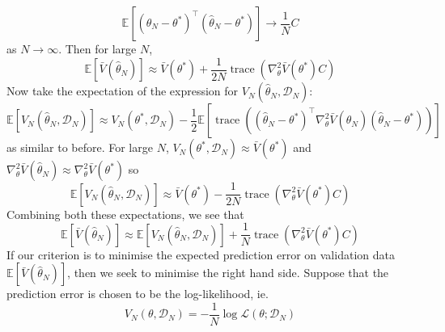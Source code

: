 \documentclass[11pt]{report} %
\begin{document}
\begin{equation}
\mathbb{E}\left[\left(\hat{\theta}_{N} - \theta^{*}\right)^{\top}\left(\hat{\theta}_{N} - \theta^{*}\right)\right] \to \dfrac{1}{N}C
\end{equation}
as $N\to\infty$. Then for large $N$,
\begin{equation}
\mathbb{E}\left[\bar{V}\left(\hat{\theta}_{N}\right)\right] \approx \bar{V}\left(\theta^{*}\right) + \dfrac{1}{2N}\operatorname{trace}\left(\nabla_{\theta}^{2}\bar{V}\left(\theta^{*}\right)C\right)
\end{equation}
Now take the expectation of the expression for $V_{N}\left(\hat{\theta}_{N}, \mathcal{D}_{N}\right)$:
\begin{equation}
\mathbb{E}\left[V_{N}\left(\hat{\theta}_{N}, \mathcal{D}_{N}\right)\right] \approx V_{N}\left(\theta^{*}, \mathcal{D}_{N}\right) - \dfrac{1}{2}\mathbb{E}\left[\operatorname{trace}\left(\left(\hat{\theta}_{N} - \theta^{*}\right)^{\top}\nabla_{\theta}^{2}\bar{V}\left(\hat{\theta}_{N}\right)\left(\hat{\theta}_{N} - \theta^{*}\right)\right)\right]
\end{equation}
as similar to before. For large $N$, $V_{N}\left(\theta^{*}, \mathcal{D}_{N}\right)\approx \bar{V}\left(\theta^{*}\right)$ and $\nabla_{\theta}^{2}\bar{V}\left(\hat{\theta}_{N}\right) \approx \nabla_{\theta}^{2}\bar{V}\left(\theta^{*}\right)$ so
\begin{equation}
\mathbb{E}\left[V_{N}\left(\hat{\theta}_{N}, \mathcal{D}_{N}\right)\right] \approx \bar{V}\left(\theta^{*}\right) - \dfrac{1}{2N}\operatorname{trace}\left(\nabla_{\theta}^{2}\bar{V}\left(\theta^{*}\right)C\right)
\end{equation}
Combining both these expectations, we see that
\begin{equation}
\mathbb{E}\left[\bar{V}\left(\hat{\theta}_{N}\right)\right] \approx \mathbb{E}\left[V_{N}\left(\hat{\theta}_{N}, \mathcal{D}_{N}\right)\right] + \dfrac{1}{N}\operatorname{trace}\left(\nabla_{\theta}^{2}\bar{V}\left(\theta^{*}\right)C\right)
\end{equation}
If our criterion is to minimise the expected prediction error on validation data $\mathbb{E}\left[\bar{V}\left(\hat{\theta}_{N}\right)\right]$, then we seek to minimise the right hand side. Suppose that the prediction error is chosen to be the log-likelihood, ie.
\begin{equation}
V_{N}\left(\theta, \mathcal{D}_{N}\right)  = -\dfrac{1}{N}\log\mathcal{L}\left(\theta; \mathcal{D}_{N}\right)
\end{equation}
\end{document}
